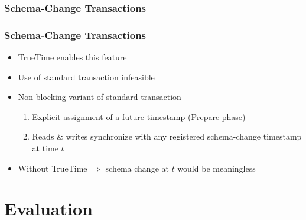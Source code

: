 \documentclass{beamer}
\begin{document}
\subsubsection{Schema-Change Transactions}
\begin{frame}
  \frametitle{Schema-Change Transactions}
  \begin{itemize}
    \item{TrueTime enables this feature}
    \item{Use of standard transaction infeasible}
    \item{Non-blocking variant of standard transaction}
    \begin{enumerate}
      \item{Explicit assignment of a future timestamp (Prepare phase)}
      \item{Reads \& writes synchronize with any registered schema-change
        timestamp at time $t$
      }
    \end{enumerate}
    \item{Without TrueTime $\Rightarrow$ schema change at $t$ would be meaningless
    }
  \end{itemize}
\end{frame}


\section{Evaluation}
\end{document}
